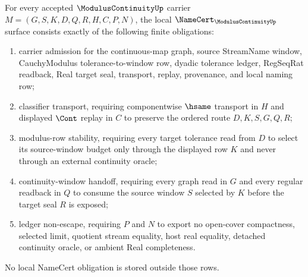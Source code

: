 \begin{theorem}
\label{thm:modulus-continuity-namecert-obligations}
For every accepted $\ModulusContinuityUp$ carrier $M=(G,S,K,D,Q,R,H,C,P,N)$, the local $\NameCert_{\ModulusContinuityUp}$ surface consists exactly of the following finite obligations:
\begin{enumerate}
\item carrier admission for the continuous-map graph, source StreamName window, CauchyModulus tolerance-to-window row, dyadic tolerance ledger, RegSeqRat readback, Real target seal, transport, replay, provenance, and local naming row;
\item classifier transport, requiring componentwise $\hsame$ transport in $H$ and displayed $\Cont$ replay in $C$ to preserve the ordered route $D,K,S,G,Q,R$;
\item modulus-row stability, requiring every target tolerance read from $D$ to select its source-window budget only through the displayed row $K$ and never through an external continuity oracle;
\item continuity-window handoff, requiring every graph read in $G$ and every regular readback in $Q$ to consume the source window $S$ selected by $K$ before the target seal $R$ is exposed;
\item ledger non-escape, requiring $P$ and $N$ to export no open-cover compactness, selected limit, quotient stream equality, host real equality, detached continuity oracle, or ambient Real completeness.
\end{enumerate}
No local NameCert obligation is stored outside those rows.
\end{theorem}
